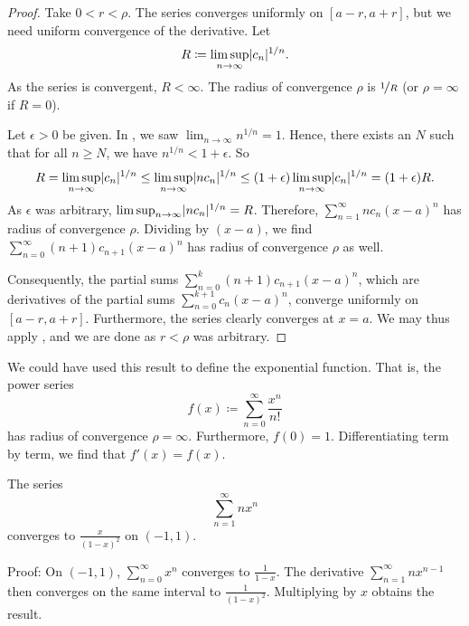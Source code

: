 \begin{proof}
Take $0 < r < \rho$.
The series converges uniformly on
$[a-r,a+r]$,
but we need uniform convergence of the derivative.
Let
\begin{equation*}
R \coloneqq \limsup_{n \to \infty} \lvert {c_n} \rvert^{1/n} .
\end{equation*}
As the series is convergent, $R < \infty$.
The radius of convergence $\rho$ is $\nicefrac{1}{R}$ (or $\rho = \infty$ if $R=0$).

Let $\epsilon > 0$ be given.  In ,
we saw $\lim_{n\to\infty} n^{1/n} = 1$.
Hence, there exists an $N$ such that for all $n \geq N$, we have
$n^{1/n} < 1+\epsilon$.
So
\begin{equation*}
R = 
\limsup_{n \to \infty}
\lvert {c_n} \rvert^{1/n}
\leq
\limsup_{n \to \infty}
\lvert {n c_n} \rvert^{1/n}
\leq
(1+\epsilon)
\limsup_{n \to \infty}
\lvert {c_n} \rvert^{1/n}
=
(1+\epsilon)R .
\end{equation*}
As $\epsilon$ was arbitrary, $\limsup_{n \to \infty} \lvert {n c_n} \rvert^{1/n} = R$.
Therefore, $\sum_{n=1}^\infty n c_{n} {(x-a)}^{n}$ has radius of
convergence $\rho$.  Dividing by $(x-a)$, we find
$\sum_{n=0}^\infty (n+1) c_{n+1} {(x-a)}^{n}$ has radius of convergence
$\rho$ as well.

Consequently, the partial sums 
$\sum_{n=0}^k (n+1) c_{n+1} {(x-a)}^{n}$,
which are derivatives of the partial sums
$\sum_{n=0}^{k+1} c_{n} {(x-a)}^{n}$,
converge uniformly on $[a-r,a+r]$.  Furthermore,
the series clearly converges at $x=a$.
We may thus apply , and
we are done as $r < \rho$ was arbitrary.
\end{proof}

\begin{example} \label{example:exponentialbypowerseries}
We could have used this result to define the exponential function.  That is,
the power series
\begin{equation*}
f(x) \coloneqq \sum_{n=0}^\infty \frac{x^n}{n!}
\end{equation*}
has radius of convergence $\rho=\infty$.  Furthermore,
$f(0) = 1$.
Differentiating
term by term, we find that $f'(x) = f(x)$.
\end{example}

\begin{example}
The series
\begin{equation*}
\sum_{n=1}^\infty n x^n
\end{equation*}
converges to $\frac{x}{{(1-x)}^2}$ on $(-1,1)$.

Proof:
On $(-1,1)$, $\sum_{n=0}^\infty x^n$ converges to
$\frac{1}{1-x}$.  The derivative $\sum_{n=1}^\infty n x^{n-1}$ then converges
on the same interval to $\frac{1}{{(1-x)}^2}$.  Multiplying by $x$
obtains the result.
\end{example}


